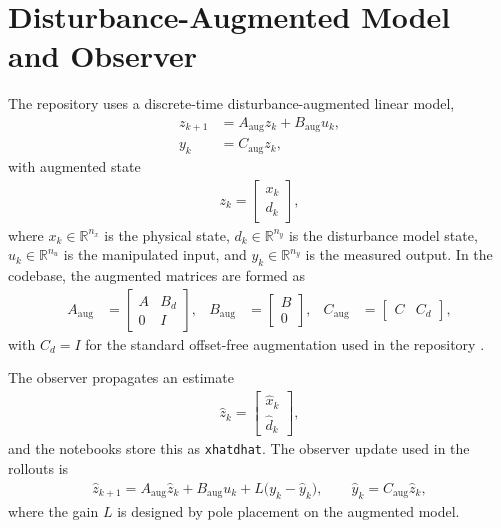 \documentclass[11pt]{article}
\begin{document}
\section{Disturbance-Augmented Model and Observer}
The repository uses a discrete-time disturbance-augmented linear model,
\begin{align}
z_{k+1} &= A_{\mathrm{aug}} z_k + B_{\mathrm{aug}} u_k, \label{eq:aug_dyn}\\
y_k &= C_{\mathrm{aug}} z_k, \label{eq:aug_out}
\end{align}
with augmented state
\begin{align}
z_k = \begin{bmatrix} x_k \\ d_k \end{bmatrix},
\end{align}
where $x_k \in \mathbb{R}^{n_x}$ is the physical state, $d_k \in \mathbb{R}^{n_y}$ is the disturbance model state, $u_k \in \mathbb{R}^{n_u}$ is the manipulated input, and $y_k \in \mathbb{R}^{n_y}$ is the measured output. In the codebase, the augmented matrices are formed as
\begin{align}
A_{\mathrm{aug}} &= \begin{bmatrix} A & B_d \\ 0 & I \end{bmatrix},
&
B_{\mathrm{aug}} &= \begin{bmatrix} B \\ 0 \end{bmatrix},
&
C_{\mathrm{aug}} &= \begin{bmatrix} C & C_d \end{bmatrix},
\end{align}
with $C_d = I$ for the standard offset-free augmentation used in the repository \cite{pannocchia2003,pannocchia2007}.

The observer propagates an estimate
\begin{align}
\hat z_k = \begin{bmatrix} \hat x_k \\ \hat d_k \end{bmatrix},
\end{align}
and the notebooks store this as \texttt{xhatdhat}. The observer update used in the rollouts is
\begin{align}
\hat z_{k+1}
= A_{\mathrm{aug}} \hat z_k + B_{\mathrm{aug}} u_k + L \big(y_k - \hat y_k\big),
\qquad
\hat y_k = C_{\mathrm{aug}} \hat z_k,
\end{align}
where the gain $L$ is designed by pole placement on the augmented model.
\end{document}
